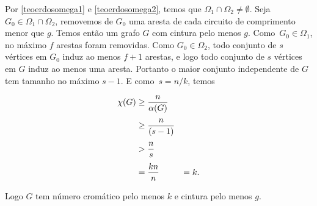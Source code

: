 Por \ref{teoerdosomega1} e \ref{teoerdosomega2}, temos que $\Omega_1 \cap \Omega_2 \neq \emptyset$. Seja $G_0 \in \Omega_1 \cap \Omega_2$, removemos de $G_0$ uma aresta de cada circuito de comprimento menor que $g$. Temos então um grafo $G$ com cintura pelo menos $g$. Como~$G_0 \in \Omega_1$, no máximo $f$ arestas foram removidas. Como $G_0 \in \Omega_2$, todo conjunto de $s$ vértices em $G_0$ induz ao menos $f+1$ arestas, e logo todo conjunto de $s$ vértices em $G$ induz ao menos uma aresta. Portanto o maior conjunto independente de $G$ tem tamanho no máximo $s-1$. E como~$s = n/k$, temos

\begin{equation*}
\setlength{\jot}{6pt}
\begin{aligned}
\chi(G) &\geq \frac{n}{\alpha(G)} \\
&\geq \frac{n}{(s-1)} \\
&> \frac{n}{s}\\
&= \frac{kn}{n} & = k.
\end{aligned}
\end{equation*}

Logo $G$ tem número cromático pelo menos $k$ e cintura pelo menos $g$.








